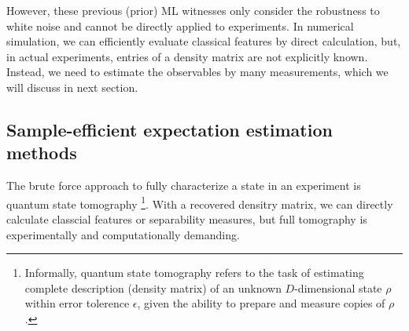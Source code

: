 \documentclass[
aps,
pra,
twocolumn,
floatfix,
]{revtex4-2}
\theoremstyle{plain}
\theoremstyle{definition}
\newtheorem{problem}{Problem}
\newcommand{\dm}{\rho}
\begin{document}
However, these previous (prior) ML witnesses only consider the robustness to white noise and cannot be directly applied to experiments.
In numerical simulation, we can efficiently evaluate classical features by direct calculation, 
but, in actual experiments, entries of a density matrix are not explicitly known.
Instead, we need to estimate the observables by many measurements, which we will discuss in next section.



\subsection{Sample-efficient expectation estimation methods}\label{sec:estimation}
The brute force approach to fully characterize a state in an experiment is quantum state tomography \cite{altepeterPhotonicStateTomography2005}
\footnote{Informally, quantum state tomography refers to the task of estimating complete description (density matrix) of an unknown $D$-dimensional state $\dm$ within error tolerence $\epsilon$, 
given the ability to prepare and measure copies of $\dm$.}.
With a recovered densitry matrix, we can directly calculate classcial features or separability measures,
but full tomography is experimentally and computationally demanding.
\end{document}
